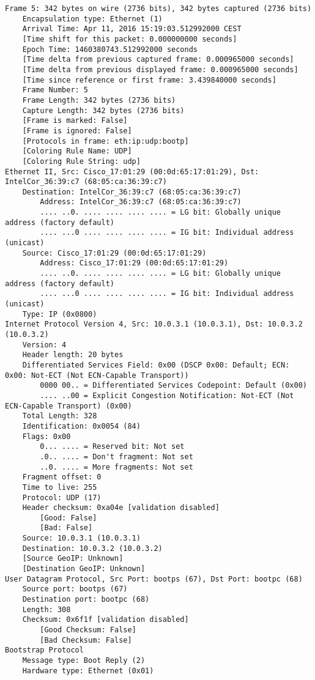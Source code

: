 \begin{lstlisting}
Frame 5: 342 bytes on wire (2736 bits), 342 bytes captured (2736 bits)
    Encapsulation type: Ethernet (1)
    Arrival Time: Apr 11, 2016 15:19:03.512992000 CEST
    [Time shift for this packet: 0.000000000 seconds]
    Epoch Time: 1460380743.512992000 seconds
    [Time delta from previous captured frame: 0.000965000 seconds]
    [Time delta from previous displayed frame: 0.000965000 seconds]
    [Time since reference or first frame: 3.439840000 seconds]
    Frame Number: 5
    Frame Length: 342 bytes (2736 bits)
    Capture Length: 342 bytes (2736 bits)
    [Frame is marked: False]
    [Frame is ignored: False]
    [Protocols in frame: eth:ip:udp:bootp]
    [Coloring Rule Name: UDP]
    [Coloring Rule String: udp]
Ethernet II, Src: Cisco_17:01:29 (00:0d:65:17:01:29), Dst: IntelCor_36:39:c7 (68:05:ca:36:39:c7)
    Destination: IntelCor_36:39:c7 (68:05:ca:36:39:c7)
        Address: IntelCor_36:39:c7 (68:05:ca:36:39:c7)
        .... ..0. .... .... .... .... = LG bit: Globally unique address (factory default)
        .... ...0 .... .... .... .... = IG bit: Individual address (unicast)
    Source: Cisco_17:01:29 (00:0d:65:17:01:29)
        Address: Cisco_17:01:29 (00:0d:65:17:01:29)
        .... ..0. .... .... .... .... = LG bit: Globally unique address (factory default)
        .... ...0 .... .... .... .... = IG bit: Individual address (unicast)
    Type: IP (0x0800)
Internet Protocol Version 4, Src: 10.0.3.1 (10.0.3.1), Dst: 10.0.3.2 (10.0.3.2)
    Version: 4
    Header length: 20 bytes
    Differentiated Services Field: 0x00 (DSCP 0x00: Default; ECN: 0x00: Not-ECT (Not ECN-Capable Transport))
        0000 00.. = Differentiated Services Codepoint: Default (0x00)
        .... ..00 = Explicit Congestion Notification: Not-ECT (Not ECN-Capable Transport) (0x00)
    Total Length: 328
    Identification: 0x0054 (84)
    Flags: 0x00
        0... .... = Reserved bit: Not set
        .0.. .... = Don't fragment: Not set
        ..0. .... = More fragments: Not set
    Fragment offset: 0
    Time to live: 255
    Protocol: UDP (17)
    Header checksum: 0xa04e [validation disabled]
        [Good: False]
        [Bad: False]
    Source: 10.0.3.1 (10.0.3.1)
    Destination: 10.0.3.2 (10.0.3.2)
    [Source GeoIP: Unknown]
    [Destination GeoIP: Unknown]
User Datagram Protocol, Src Port: bootps (67), Dst Port: bootpc (68)
    Source port: bootps (67)
    Destination port: bootpc (68)
    Length: 308
    Checksum: 0x6f1f [validation disabled]
        [Good Checksum: False]
        [Bad Checksum: False]
Bootstrap Protocol
    Message type: Boot Reply (2)
    Hardware type: Ethernet (0x01)

\end{lstlisting}
